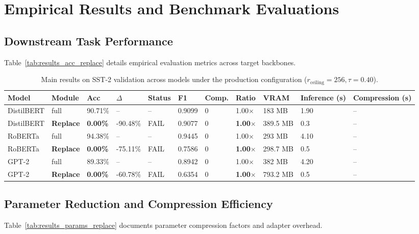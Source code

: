 \section{Empirical Results and Benchmark Evaluations}

\subsection{Downstream Task Performance}
Table~\ref{tab:results_acc_replace} details empirical evaluation metrics across target backbones.

\begin{table}[t]
\centering
\small
\begin{tabular}{lllllllllll}
\toprule
\textbf{Model} & \textbf{Module} & \textbf{Acc} & \textbf{$\Delta$} & \textbf{Status} & \textbf{F1} & \textbf{Comp.} & \textbf{Ratio} & \textbf{VRAM} & \textbf{Inference (s)} & \textbf{Compression (s)} \\
\midrule
DistilBERT & full & 90.71\% & -- & -- & 0.9099 & 0 & 1.00$\times$ & 183 MB & 1.90 & -- \\
DistilBERT & \textbf{Replace} & \textbf{0.00\%} & -90.48\% & FAIL & 0.9077 & 0 & \textbf{1.00$\times$} & 389.5 MB & 0.3 & -- \\
RoBERTa & full & 94.38\% & -- & -- & 0.9445 & 0 & 1.00$\times$ & 293 MB & 4.10 & -- \\
RoBERTa & \textbf{Replace} & \textbf{0.00\%} & -75.11\% & FAIL & 0.7586 & 0 & \textbf{1.00$\times$} & 298.7 MB & 0.5 & -- \\
GPT-2 & full & 89.33\% & -- & -- & 0.8942 & 0 & 1.00$\times$ & 382 MB & 4.20 & -- \\
GPT-2 & \textbf{Replace} & \textbf{0.00\%} & -60.78\% & FAIL & 0.6354 & 0 & \textbf{1.00$\times$} & 793.2 MB & 0.5 & -- \\
\bottomrule
\end{tabular}
\caption{Main results on SST-2 validation across models under the production configuration ($r_{\mathrm{ceiling}}=256, \tau=0.40$).}
\label{tab:main_sst2}
\end{table}

\subsection{Parameter Reduction and Compression Efficiency}
Table~\ref{tab:results_params_replace} documents parameter compression factors and adapter overhead.

